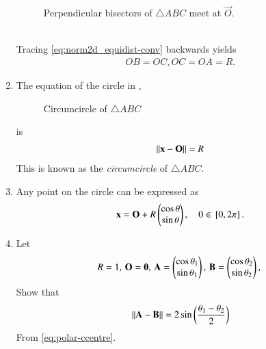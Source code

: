 \begin{enumerate}[label=\thesection.\arabic*.,ref=\thesection.\theenumi]
\begin{figure}[!ht]
\begin{center}
		\resizebox{0.6\columnwidth}{!}{}
	\end{center}
	\caption{ Perpendicular bisectors of $\triangle ABC$ meet at $\vec{O}$.}
	\label{fig:tri_ccentre}	
\end{figure}
\\
\solution Tracing
  \eqref{eq:norm2d_equidist-conv}
  backwards yields
\begin{align}
	OB = OC, OC = OA = R.
\end{align}
  \item The equation  of the circle in 
	,
\begin{figure}[!ht]
	\begin{center}
		\resizebox{0.6\columnwidth}{!}{}
	\end{center}
	\caption{Circumcircle of $\triangle ABC$}
	\label{fig:tri_ccircle-ang}	
\end{figure}
	is
  \begin{align}
	  \left\lVert\mathbf{x}-\mathbf{O}\right\rVert = R
  \end{align}
  This is known as the {\em circumcircle} of $\triangle ABC$.
\item Any point on the circle can be expressed as 
  \begin{align}
	  \mathbf{x} = \mathbf{O} + R\begin{pmatrix}\cos \theta \\ \sin \theta\end{pmatrix}, \quad 0 \in {}\left[0, 2\pi\right]
\label{eq:polar-ccentre}.
  \end{align}
  \item Let
  \begin{align}
	  R = 1,\,
	  \mathbf{O} = \mathbf{0} ,\,
	  \mathbf{A} = \begin{pmatrix}\cos \theta_1 \\ \sin \theta_1\end{pmatrix},\,
	  \mathbf{B} = \begin{pmatrix}\cos \theta_2 \\ \sin \theta_2\end{pmatrix},\,
  \end{align}
Show that 
  \begin{align}
	  \left\lVert\mathbf{A}-\mathbf{B}\right\rVert = 
	   2 \sin \left(\frac{\theta_1-\theta_2}{2}\right)
\label{eq:norm-polar-ccentre}
  \end{align}
  \solution 
  From 
\eqref{eq:polar-ccentre}.
  \begin{align}

\end{align}
\end{enumerate}
